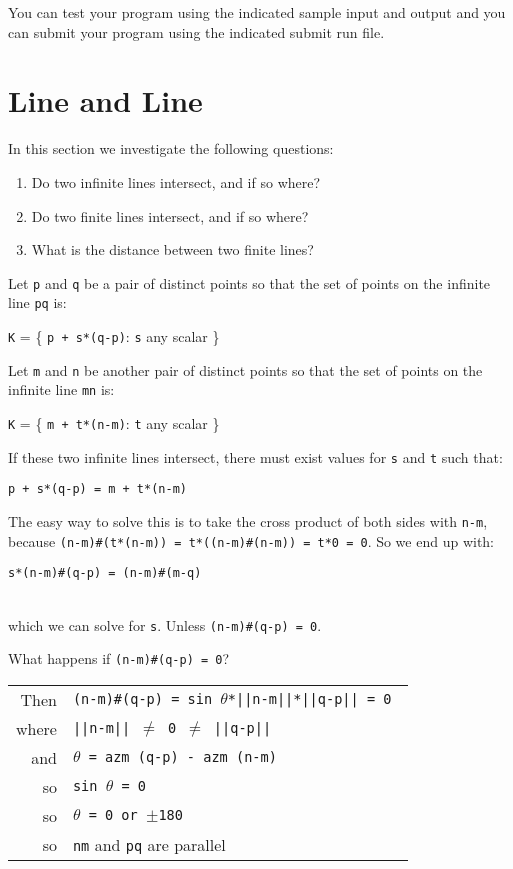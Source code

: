 \documentclass[12pt]{article}
\begin{document}
You can test your program using the indicated sample input and
output and you can submit your program using the indicated submit
run file.

\newpage


\section{Line and Line}
In this section we investigate the following questions:
\begin{enumerate}
\item Do two infinite lines intersect, and if so where?
\item Do two finite lines intersect, and if so where?
\item What is the distance between two finite lines?
\end{enumerate}

Let {\tt p} and {\tt q} be a pair of distinct points so that the set
of points on the infinite line {\tt pq} is: \\
\centerline{{\tt K} = \{ {\tt p + s*(q-p)}: {\tt s} any scalar \}} 

Let {\tt m} and {\tt n} be another pair of distinct points so that the set
of points on the infinite line {\tt mn} is: \\
\centerline{{\tt K} = \{ {\tt m + t*(n-m)}: {\tt t} any scalar \}} 

If these two infinite lines intersect, there must exist values for
{\tt s} and {\tt t} such that: \\
\centerline{{\tt p + s*(q-p) = m + t*(n-m)}}

The easy way to solve this is to take the cross product of both
sides with {\tt n-m}, because
{\tt (n-m)\#(t*(n-m)) = t*((n-m)\#(n-m)) = t*0 = 0}.
So we end up with: \\
\centerline{\tt s*(n-m)\#(q-p) = (n-m)\#(m-q)} \\
which we can solve for {\tt s}.  Unless {\tt (n-m)\#(q-p) = 0}.

What happens if {\tt (n-m)\#(q-p) = 0}? \\
\hspace*{0.3in}\begin{tabular}{r@{~~}l}
Then    & \tt (n-m)\#(q-p) = sin $\theta$*||n-m||*||q-p|| = 0 \\
where   & \tt ||n-m|| $\neq$ 0 $\neq$ ||q-p|| \\
and     & \tt $\theta$ = azm (q-p) - azm (n-m) \\
so      & \tt sin $\theta$ = 0 \\
so      & \tt $\theta$ = 0 or $\pm$180 \\
so      & {\tt nm} and {\tt pq} are parallel \\
        \end{tabular}
\end{document}
